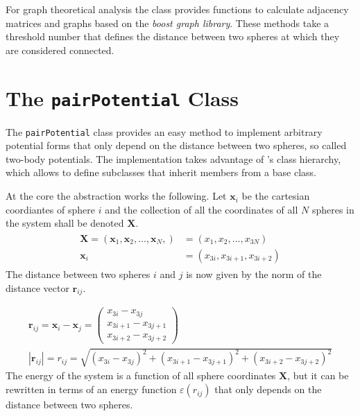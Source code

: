 For graph theoretical analysis the class provides functions to calculate
adjacency matrices and graphs based on the \textit{boost graph
library}\autocite{_boost_2002}. These methods take a threshold number that
defines the distance between two spheres at which they are considered
connected.

\section{The \texttt{pairPotential} Class}
\label{sec:thepairpotentialclass}

The \texttt{pairPotential} class provides an easy method to implement arbitrary
potential forms that only depend on the distance between two spheres, so called
two-body potentials. The implementation takes advantage of \Cpp's class
hierarchy, which allows to define subclasses that inherit members from a base
class.

At the core the abstraction works the following. Let $\mathbf{x}_i$ be the
cartesian coordiantes of sphere $i$ and the collection of all the coordinates
of all $N$ spheres in the system shall be denoted $\mathbf{X}$.
%
\begin{align}
    \begin{aligned}
        \mathbf{X}=(\mathbf{x}_1,\mathbf{x}_2,\ldots,\mathbf{x}_N,)&=(x_1,x_2,\ldots,x_{3N}) \\
            \mathbf{x}_i &= (x_{3i},x_{3i+1},x_{3i+2})
    \end{aligned}
\end{align}%
%
The distance between two spheres $i$ and $j$ is now given by the norm of the
distance vector $\mathbf{r}_{ij}$.

\begin{align}
    \mathbf{r}_{ij}=\mathbf{x}_i-\mathbf{x}_j=
    \begin{pmatrix}
        x_{3i} - x_{3j}\\
        x_{3i+1} - x_{3j+1}\\
        x_{3i+2} - x_{3j+2}
    \end{pmatrix}\label{eq:distancevector}\\
    |\mathbf{r}_{ij}|=r_{ij}=\sqrt{(x_{3i} - x_{3j})^2 + (x_{3i+1} - x_{3j+1})^2 + (x_{3i+2} - x_{3j+2})^2}\label{eq:distance}
\end{align}
%
The energy of the system is a function of all sphere coordinates $\mathbf{X}$,
but it can be rewritten in terms of an energy function $\varepsilon(r_{ij})$ that only depends on the
distance between two spheres.

